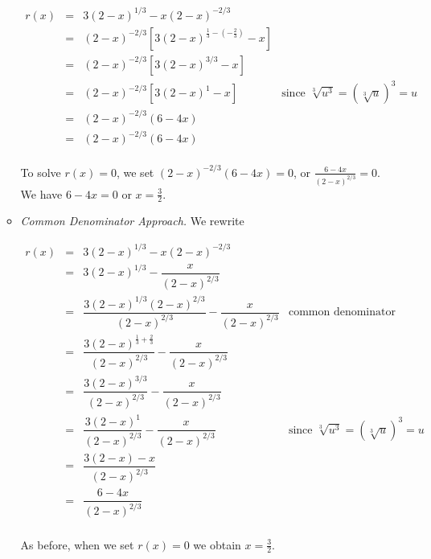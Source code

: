 \begin{ex}
\begin{enumerate}
\begin{itemize}
\[ \begin{array}{rclr}

r(x)  & = & 3 (2-x)^{1/3} - x (2-x)^{-2/3} & \\ [3pt]
      & = & (2-x)^{-2/3} \left[ 3 (2-x)^{\frac{1}{3} - \left(-\frac{2}{3}\right)} - x\right] & \\ [6pt]
      & = & (2-x)^{-2/3}\left[3(2-x)^{3/3} - x\right] & \\ [3pt]
      & = & (2-x)^{-2/3}\left[3(2-x)^{1} - x\right] & \mbox{since $\sqrt[3]{u^3} = \left(\sqrt[3]{u}\right)^{3} = u$} \\ [3pt]
      & = & (2-x)^{-2/3}\left(6-4x\right) & \\ [3pt]
      & = & (2-x)^{-2/3}\left(6-4x\right) & \\
      
\end{array}\]

To solve $r(x) = 0$, we set $(2-x)^{-2/3}\left(6-4x\right) = 0$, or $\frac{6-4x}{(2-x)^{2/3}} = 0$.  We have $6-4x = 0$ or $x = \frac{3}{2}$.

\pagebreak 

\item \textit{Common Denominator Approach.}  We rewrite 

\[ \begin{array}{rclr}

r(x)  & = & 3 (2-x)^{1/3} - x (2-x)^{-2/3} & \\ [3pt]
      & = & 3 (2-x)^{1/3} - \dfrac{x}{(2-x)^{2/3}} & \\ [10pt]
      & = & \dfrac{3 (2-x)^{1/3}(2-x)^{2/3}}{(2-x)^{2/3}} - \dfrac{x}{(2-x)^{2/3}} & \mbox{common denominator} \\ [10pt]
      & = & \dfrac{3 (2-x)^{\frac{1}{3} + \frac{2}{3}}}{(2-x)^{2/3}} - \dfrac{x}{(2-x)^{2/3}} &  \\ [10pt]
      & = & \dfrac{3 (2-x)^{3/3}}{(2-x)^{2/3}} - \dfrac{x}{(2-x)^{2/3}} & \\ [10pt]
      & = & \dfrac{3 (2-x)^1}{(2-x)^{2/3}} - \dfrac{x}{(2-x)^{2/3}} & \mbox{since $\sqrt[3]{u^3} = \left(\sqrt[3]{u}\right)^{3} = u$} \\ [10pt]
      & = & \dfrac{3 (2-x) - x}{(2-x)^{2/3}} & \\ [10pt]
      & = & \dfrac{6-4x}{(2-x)^{2/3}} & \\

       
\end{array}\]


As before, when we set $r(x) = 0$ we obtain $x = \frac{3}{2}$.



\end{itemize}
\end{enumerate}
\end{ex}
